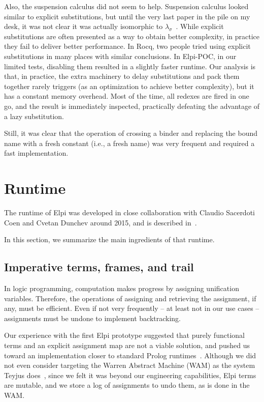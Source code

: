 \documentclass[a4paper, 11pt]{book}
\begin{document}
Also, the suspension calculus did not seem to help. Suspension calculus looked
similar to explicit substitutions, but until the very last paper in the pile on
my desk, it was not clear it was actually isomorphic to
$\lambda_\sigma$~\cite{expsubst}. While explicit substitutions are often
presented as a way to obtain better complexity, in practice they fail to
deliver better performance. In Rocq, two people tried using explicit
substitutions in many places with similar conclusions. In Elpi-POC, in our
limited tests, disabling them resulted in a slightly faster runtime. Our analysis is
that, in practice, the extra machinery to delay substitutions and pack them
together rarely triggers (as an optimization to achieve better complexity), but
it has a constant memory overhead. Most of the time, all redexes are fired in
one go, and the result is immediately inspected, practically defeating
the advantage of a lazy substitution.

Still, it was clear that the operation of crossing a binder and replacing the
bound name with a fresh constant (i.e., a fresh name) was very frequent and
required a fast implementation.

\newcommand{\theotherfragment}{\ensuremath{L_{\lambda}}\xspace}
\newcommand{\thefragment}{\ensuremath{L_{\lambda}^{\beta}}\xspace}
\newtheorem{definition}{Definition}

\section{Runtime}

The runtime of Elpi was developed in close collaboration with Claudio
Sacerdoti Coen and Cvetan Dunchev around 2015, and is described
in~\cite{dunchev15lpar}.

In this section, we summarize the main ingredients of that runtime.

\subsection{Imperative terms, frames, and trail}\label{sec:terms}

In logic programming, computation makes progress by assigning unification
variables. Therefore, the operations of assigning and retrieving the assignment,
if any, must be efficient. Even if not very frequently -- at least not in our use
cases -- assignments must be undone to implement backtracking.

Our experience with the first Elpi prototype suggested that purely functional
terms and an explicit assignment map are not a viable solution, and pushed us
toward an implementation closer to standard Prolog runtimes~\cite{wam}.
Although we did not even consider targeting the Warren Abstract Machine (WAM)
as the system Teyjus does~\cite{teyjus}, since we felt it was beyond our
engineering capabilities, Elpi terms are mutable, and we store a log of
assignments to undo them, as is done in the WAM.
\end{document}
